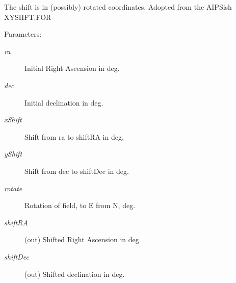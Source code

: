 The shift is in (possibly) rotated coordinates. Adopted from the AIPSish XYSHFT.FOR \begin{Desc}
\item[Parameters:]
\begin{description}
\item[{\em ra}]Initial Right Ascension in deg. \item[{\em dec}]Initial declination in deg. \item[{\em x\-Shift}]Shift from ra to shift\-RA in deg. \item[{\em y\-Shift}]Shift from dec to shift\-Dec in deg. \item[{\em rotate}]Rotation of field, to E from N, deg. \item[{\em shift\-RA}](out) Shifted Right Ascension in deg. \item[{\em shift\-Dec}](out) Shifted declination in deg. \end{description}
\end{Desc}
